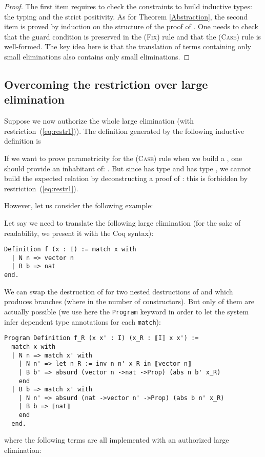 \documentclass[a4paper,USenglish]{lipics}
\def\coq{\textsf{Coq}\xspace}
\begin{document}
\begin{proof}
  The first item requires
  to check the constraints to build inductive types: the typing and the
  strict positivity. As for \textsf{Theorem \ref{Abstraction}}, the second item
  is proved by induction on the structure of the proof of . One needs to check that the guard condition is preserved in
  the (\textsc{Fix}) rule and that the (\textsc{Case}) rule is
  well-formed. The key idea here is that the translation of terms
  containing only small eliminations also contains only small
  eliminations.
\end{proof}


\subsection{\label{OvercomeWE}Overcoming the restriction over large
  elimination}

Suppose we now authorize the whole large elimination (with
restriction~(\ref{eq:restr1})). The definition generated by the following
inductive definition  is

If we want to prove parametricity for the (\textsc{Case}) rule when we
build a , one should provide an inhabitant of:
.
But since  has type  and  has type , we cannot build the expected relation by
deconstructing a proof of : this is
forbidden by restriction~(\ref{eq:restr1}).

However, let us consider the following example:

Let say we need to translate the following large elimination (for the
sake of readability, we present it with the \coq syntax):
\begin{lstlisting}
Definition f (x : I) := match x with
  | N n => vector n
  | B b => nat
end.
\end{lstlisting}
We can swap the destruction of  for two nested destructions of
 and  which produces  branches (where  in the number of constructors). But only  of them are actually possible
(we use here the \texttt{Program} keyword in order to let the system infer dependent type annotations for each \texttt{match}):
\begin{lstlisting}
Program Definition f_R (x x' : I) (x_R : ⟦I⟧ x x') :=
  match x with
  | N n => match x' with
    | N n' => let n_R := inv n n' x_R in ⟦vector n⟧
    | B b' => absurd (vector n ->nat ->Prop) (abs n b' x_R)
    end
  | B b => match x' with
    | N n' => absurd (nat ->vector n' ->Prop) (abs b n' x_R)
    | B b => ⟦nat⟧
    end
  end.
\end{lstlisting}
where the following terms are all implemented with an authorized large
elimination:
\end{document}
